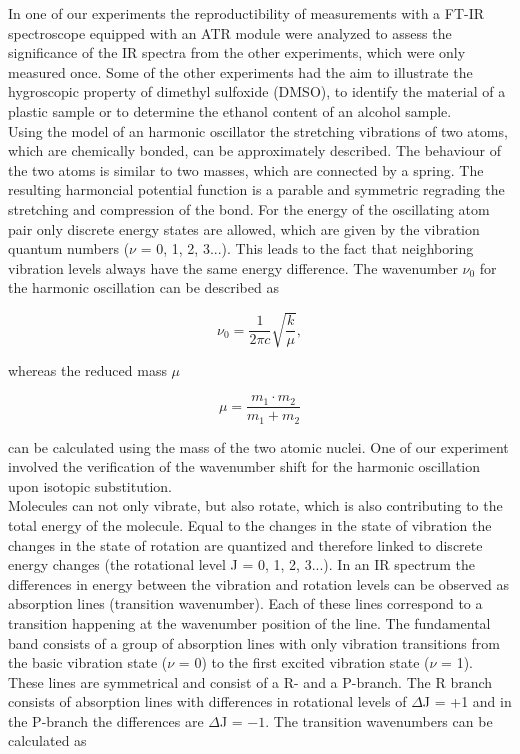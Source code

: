 \documentclass[a4paper,abstracton]{article}	                       %
\renewcommand{\cite}{\supercite}						%
\begin{document}
In one of our experiments the reproductibility of measurements with a FT-IR spectroscope equipped with an ATR module were analyzed to assess the significance of the IR spectra from the other experiments, which were only measured once. Some of the other experiments had the aim to illustrate the hygroscopic property of dimethyl sulfoxide (DMSO), to identify the material of a plastic sample or to determine the ethanol content of an alcohol sample.\\

Using the model of an harmonic oscillator the stretching vibrations of two atoms, which are chemically bonded, can be approximately described. The behaviour of the two atoms is similar to two masses, which are connected by a spring. The resulting harmoncial potential function is a parable and symmetric regrading the stretching and compression of the bond. For the energy of the oscillating atom pair only discrete energy states are allowed, which are given by the vibration quantum numbers ($\nu$ = 0, 1, 2, 3...). This leads to the fact that neighboring vibration levels always have the same energy difference. The wavenumber $\nu_{0}$ for the harmonic oscillation can be described as

\begin{equation}\label{eq:TeilF}
   {\nu_{0}} = \frac{1}{2\pi c}\sqrt{\frac{k}{\mu}},
\end{equation}

whereas the reduced mass $\mu$

\begin{equation}\label{eq:TeilF1}
   {\mu} = \frac{m_1\cdot m_2}{m_1 + m_2}
\end{equation}

can be calculated using the mass of the two atomic nuclei\cite{meister}. One of our experiment involved the verification of the wavenumber shift for the harmonic oscillation upon isotopic substitution. \\

Molecules can not only vibrate, but also rotate, which is also contributing to the total energy of the molecule. Equal to the changes in the state of vibration the changes in the state of rotation are quantized and therefore linked to discrete energy changes (the rotational level J = 0, 1, 2, 3...). In an IR spectrum the differences in energy between the vibration and rotation levels can be observed as absorption lines (transition wavenumber). Each of these lines correspond to a transition happening at the wavenumber position of the line. The fundamental band consists of a group of absorption lines with only vibration transitions from the basic vibration state ($\nu$ = 0) to the first excited vibration state ($\nu$ = 1). These lines are symmetrical and consist of a R- and a P-branch. The R branch consists of absorption lines with differences in rotational levels of $\Delta$J = +1 and in the P-branch the differences are $\Delta$J = $- 1$. The transition wavenumbers can be calculated as
\end{document}

